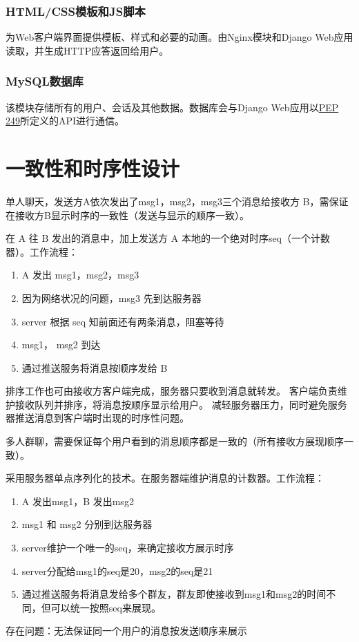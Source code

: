 \subsubsection{HTML/CSS模板和JS脚本}
为Web客户端界面提供模板、样式和必要的动画。由Nginx模块和Django Web应用读取，并生成HTTP应答返回给用户。

\subsubsection{MySQL数据库}
该模块存储所有的用户、会话及其他数据。数据库会与Django Web应用以\href{https://www.python.org/dev/peps/pep-0249}{PEP 249}所定义的API进行通信。




{\color{red}
\section{一致性和时序性设计}
单人聊天，发送方A依次发出了msg1，msg2，msg3三个消息给接收方 B，需保证在接收方B显示时序的一致性（发送与显示的顺序一致）。

在 A 往 B 发出的消息中，加上发送方 A 本地的一个绝对时序seq（一个计数器）。工作流程：
\begin{enumerate}
	\item A 发出 msg1，msg2，msg3
	\item 因为网络状况的问题，msg3 先到达服务器
	\item server 根据 seq 知前面还有两条消息，阻塞等待
	\item msg1， msg2 到达
	\item 通过推送服务将消息按顺序发给 B
\end{enumerate}

排序工作也可由接收方客户端完成，服务器只要收到消息就转发。
客户端负责维护接收队列并排序，将消息按顺序显示给用户。
减轻服务器压力，同时避免服务器推送消息到客户端时出现的时序性问题。

多人群聊，需要保证每个用户看到的消息顺序都是一致的（所有接收方展现顺序一致）。

采用服务器单点序列化的技术。在服务器端维护消息的计数器。工作流程：
\begin{enumerate}
	\item A 发出msg1，B 发出msg2
	\item msg1 和 msg2 分别到达服务器
	\item server维护一个唯一的seq，来确定接收方展示时序
	\item server分配给msg1的seq是20，msg2的seq是21
	\item 通过推送服务将消息发给多个群友，群友即使接收到msg1和msg2的时间不同，但可以统一按照seq来展现。
\end{enumerate}
存在问题：无法保证同一个用户的消息按发送顺序来展示
}

